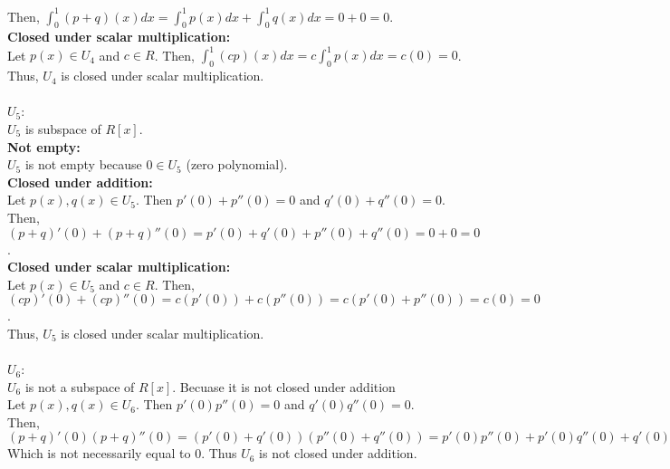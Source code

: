 \documentclass{article}
\begin{document}
Then, \(\int_0^1 (p + q)(x) dx = \int_0^1 p(x) dx + \int_0^1 q(x) dx = 0 + 0 = 0\). \\
\textbf{Closed under scalar multiplication:} \\
Let \(p(x) \in U_4\) and \(c \in R\). Then, \(\int_0^1 (cp)(x) dx = c\int_0^1 p(x) dx = c(0) = 0\). \\
Thus, \(U_4\) is closed under scalar multiplication. \\
\\
\(U_5\): \\
\(U_5\) is subspace of \(R[x]\). \\
\textbf{Not empty:} \\
\(U_5\) is not empty because \(0 \in U_5\) (zero polynomial). \\
\textbf{Closed under addition:} \\
Let \(p(x), q(x) \in U_5\). Then \(p'(0) + p''(0) = 0\) and \(q'(0) + q''(0) = 0\). \\
Then, \((p + q)'(0) + (p + q)''(0) = p'(0) + q'(0) + p''(0) + q''(0) = 0 + 0 = 0\). \\
\textbf{Closed under scalar multiplication:} \\
Let \(p(x) \in U_5\) and \(c \in R\). Then, \((cp)'(0) + (cp)''(0) = c(p'(0)) + c(p''(0)) = c(p'(0) + p''(0)) = c(0) = 0\). \\
Thus, \(U_5\) is closed under scalar multiplication. \\
\\
\(U_6\): \\
\(U_6\) is not a subspace of \(R[x]\). Becuase it is not closed under addition \\
Let \(p(x), q(x) \in U_6\). Then \(p'(0)p''(0) = 0\) and \(q'(0)q''(0) = 0\). \\
Then, \((p + q)'(0)(p + q)''(0) = (p'(0) + q'(0)) (p''(0) + q''(0)) = p'(0)p''(0) + p'(0)q''(0) + q'(0)p''(0) + q'(0)q''(0) = p'(0)q''(0) + q'(0)p''(0)\) \\
Which is not necessarily equal to 0. Thus \(U_6\) is not closed under addition. \\
\end{document}
